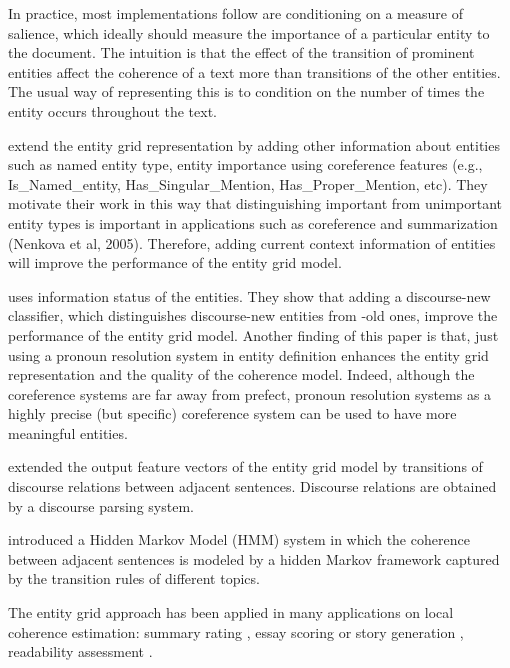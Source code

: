 In practice, most implementations follow  are conditioning on a measure of
salience, which ideally should measure the importance of a particular entity to the document. 
The intuition is that the effect of the transition of prominent entities affect the coherence of a text more than transitions of the other entities. 
The usual way of representing this is to condition on the number of times the entity occurs throughout the text.

 extend the entity grid representation by adding other information about entities such as named entity type, entity importance using coreference features (e.g., Is\_Named\_entity, Has\_Singular\_Mention, Has\_Proper\_Mention, etc). 
They motivate their work in this way that distinguishing important from unimportant entity types is important in applications such as coreference \cite{haghighi10} and summarization \cite{?}(Nenkova et al, 2005).
Therefore, adding current context information of entities will improve the performance of the entity grid model. 

 uses information status of the entities. 
They show that adding a discourse-new classifier, which distinguishes discourse-new entities from -old ones, improve the performance of the entity grid model. 
Another finding of this paper is that, just using a pronoun resolution system in entity definition enhances the entity grid representation and the quality of the coherence model. 
Indeed, although the coreference systems are far away from prefect, pronoun resolution systems as a highly precise (but specific) coreference system can be used to have more meaningful entities. 

 extended the output feature vectors of the entity grid model by transitions of discourse relations between adjacent sentences.  
Discourse relations are obtained by a discourse parsing system. 

 introduced a Hidden Markov Model (HMM) system in which the coherence between adjacent sentences is modeled by a hidden Markov framework captured by the transition rules of different topics.
 

The entity grid approach has been applied in many applications on local coherence estimation: 
summary rating \cite{barzilay05a}, 
essay scoring \cite{burstein10} or story generation \cite{mcintyre10}, readability assessment \cite{barzilay08}.


